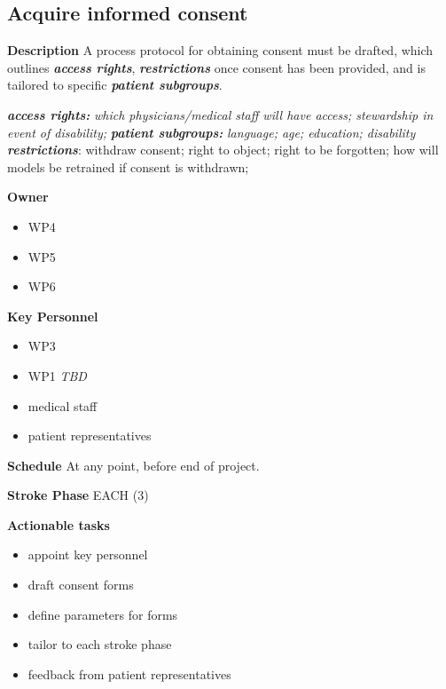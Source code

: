 \documentclass[
  letterpaper,
  DIV=11,
  numbers=noendperiod]{scrreport}
\providecommand{\tightlist}{%
  \setlength{\itemsep}{0pt}\setlength{\parskip}{0pt}}\usepackage{longtable,booktabs,array}
\begin{document}
\hypertarget{acquire-informed-consent}{%
\subsection{Acquire informed consent}\label{acquire-informed-consent}}

\textbf{Description} A process protocol for obtaining consent must be
drafted, which outlines \textbf{\emph{access rights}},
\textbf{\emph{restrictions}} once consent has been provided, and is
tailored to specific \textbf{\emph{patient subgroups}}.

\textbf{\emph{access rights:}} \emph{which physicians/medical staff will
have access; stewardship in event of disability;} \textbf{\emph{patient
subgroups:}} \emph{language; age; education; disability}\\
\textbf{\emph{restrictions}}: withdraw consent; right to object; right
to be forgotten; how will models be retrained if consent is withdrawn;

\textbf{Owner}

\begin{itemize}
\tightlist
\item
  WP4
\item
  WP5
\item
  WP6
\end{itemize}

\textbf{Key Personnel}

\begin{itemize}
\tightlist
\item
  WP3
\item
  WP1 \emph{TBD}
\item
  medical staff
\item
  patient representatives
\end{itemize}

\textbf{Schedule} At any point, before end of project.

\textbf{Stroke Phase} EACH (3)

\textbf{Actionable tasks}

\begin{itemize}
\tightlist
\item
  appoint key personnel
\item
  draft consent forms
\item
  define parameters for forms
\item
  tailor to each stroke phase
\item
  feedback from patient representatives
\end{itemize}
\end{document}
